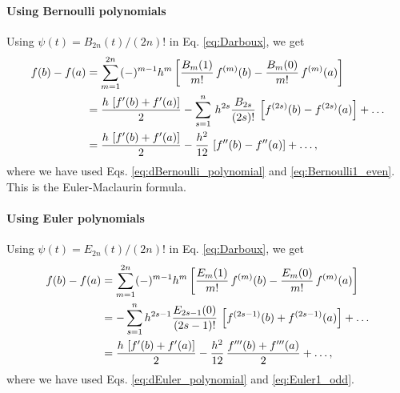 \documentclass[aip,jcp,preprint,notitlepage, superscriptaddress]{revtex4-1}
\begin{document}
\paragraph{Using Bernoulli polynomials}



Using $\psi(t) = B_{2n}(t)/(2n)!$ in Eq. \eqref{eq:Darboux},
we get
\begin{align}
f(b) - f(a)
&=
\sum_{m = 1}^{2n}
  (-)^{m - 1} h^m
  \left[
    \frac{ B_m(1) } {m!} \, f^{(m)}(b)
    -
    \frac{ B_m(0) } {m!} \, f^{(m)}(a)
  \right]
\notag \\
&=
\frac{ h \, \left[
    f'(b) + f'(a)
  \right]
} {2 }
-
\sum_{s = 1}^{n}
\, h^{2 s}
\frac{ B_{2 s} }{ (2 s)! }
    \, \left[f^{(2 s)}(b) - f^{(2 s)}(a)\right]
  + \dots
\notag \\
&=
\frac{ h \, \left[
    f'(b) + f'(a)
  \right]
} {2 }
-
\frac{ h^2 }{ 12 }
    \, \left[f''(b) - f''(a)\right]
  + \dots,
\label{eq:Darboux_Bernoulli}
\end{align}
where we have used
Eqs. \eqref{eq:dBernoulli_polynomial} and \eqref{eq:Bernoulli1_even}.
%
This is the Euler-Maclaurin formula\cite{
arfken, whittaker, wang_specfunc, abramowitz}.
%



\paragraph{Using Euler polynomials}



Using $\psi(t) = E_{2n}(t)/(2n)!$ in Eq. \eqref{eq:Darboux},
we get
\begin{align}
f(b) - f(a)
&=
\sum_{m = 1}^{2n}
  (-)^{m - 1} h^m
  \left[
    \frac{ E_m(1) } {m!} \, f^{(m)}(b)
    -
    \frac{ E_m(0) } {m!} \, f^{(m)}(a)
  \right]
\notag \\
&=
-\sum_{s = 1}^{n}
h^{2 s - 1}
\frac{ E_{2 s - 1}(0) }{ (2 s - 1)! }
    \, \left[f^{(2 s - 1)}(b) + f^{(2 s - 1)}(a)\right]
  + \dots
\notag \\
&=
\frac{ h \, \left[
    f'(b) + f'(a)
  \right]
} {2 }
-
\frac{ h^2 }{ 12 }
  \, \frac{ f'''(b) + f'''(a) } { 2 }
  + \dots,
\label{eq:Darboux_Euler}
\end{align}
where we have used
Eqs. \eqref{eq:dEuler_polynomial} and \eqref{eq:Euler1_odd}.
%
\end{document}
